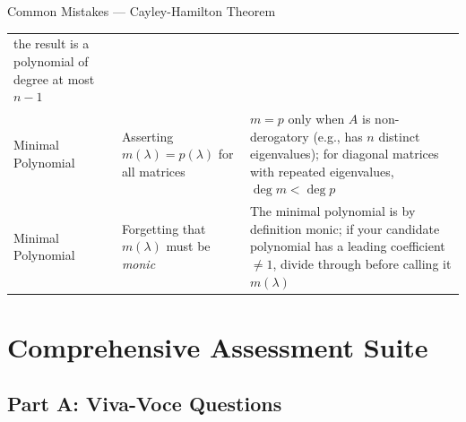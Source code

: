 \documentclass[12pt,a4paper]{article}
\begin{document}
\begin{mistakebox}{Common Mistakes --- Cayley-Hamilton Theorem}
\begin{tabular}{@{}p{3.2cm} p{5.4cm} p{6cm}@{}}
the result is a polynomial of degree at most $n-1$ \\
\addlinespace
Minimal Polynomial &
Asserting $m(\lambda)=p(\lambda)$ for all matrices &
$m = p$ only when $A$ is non-derogatory (e.g., has $n$ distinct eigenvalues);
for diagonal matrices with repeated eigenvalues, $\deg m < \deg p$ \\
\addlinespace
Minimal Polynomial &
Forgetting that $m(\lambda)$ must be \emph{monic} &
The minimal polynomial is by definition monic; if your candidate polynomial
has a leading coefficient $\neq 1$, divide through before calling it $m(\lambda)$ \\
\bottomrule
\end{tabular}
\end{mistakebox}

\section{Comprehensive Assessment Suite}

\subsection*{Part A: Viva-Voce Questions}
\end{document}
